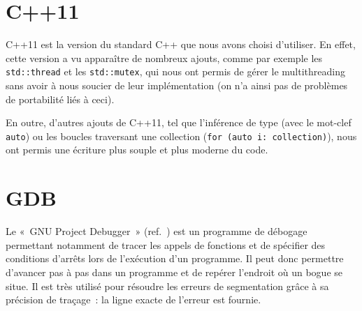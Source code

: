 \section{C++11}
C++11 est la version du standard C++ que nous avons choisi d'utiliser. En effet, cette version a vu apparaître de nombreux ajouts, comme par exemple les \verb|std::thread| et les \verb|std::mutex|, qui nous ont permis de gérer le multithreading sans avoir à nous soucier de leur implémentation (on n'a ainsi pas de problèmes de portabilité liés à ceci).

En outre, d'autres ajouts de C++11, tel que l'inférence de type (avec le mot-clef \verb|auto|) ou les boucles traversant une collection (\verb|for (auto i: collection)|), nous ont permis une écriture plus souple et plus moderne du code.

\section{GDB}
Le «~GNU Project Debugger~» (ref.~\cite{gdb}) est un programme de débogage permettant notamment de tracer les appels de fonctions et de spécifier des conditions d'arrêts lors de l'exécution d'un programme. Il peut donc permettre d'avancer pas à pas dans un programme et de repérer l'endroit où un bogue se situe. Il est très utilisé pour résoudre les erreurs de segmentation grâce à sa précision de traçage~: la ligne exacte de l'erreur est fournie.
